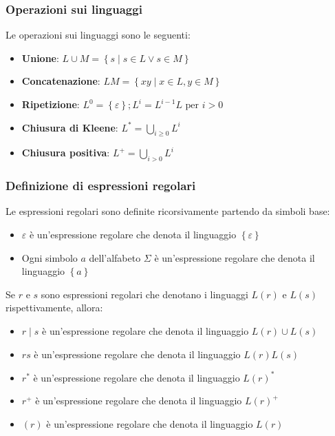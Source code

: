 \documentclass[a4paper]{article}
\begin{document}
\subsubsection{Operazioni sui linguaggi}
Le operazioni sui linguaggi sono le seguenti:
\begin{itemize}
  \item \textbf{Unione}:
    \( L \cup M = \left\{ s \mid s \in L \lor s \in M \right\} \)

  \item \textbf{Concatenazione}:
    \( LM = \left\{ xy \mid x \in L, y \in M \right\} \)

  \item \textbf{Ripetizione}:
    \( L^0 = \left\{ \varepsilon  \right\}; L^i = L^{i-1} L \text{ per } i > 0 \)

  \item \textbf{Chiusura di Kleene}:
    \( L^* = \bigcup_{i \geq 0} L^i \)

  \item \textbf{Chiusura positiva}:
    \( L^+ = \bigcup_{i > 0} L^i \)
\end{itemize}

\subsubsection{Definizione di espressioni regolari}
Le espressioni regolari sono definite ricorsivamente partendo da simboli base:
\begin{itemize}
  \item \( \varepsilon  \) è un'espressione regolare che denota il linguaggio
    \( \left\{ \varepsilon  \right\} \)

  \item Ogni simbolo \( a \) dell'alfabeto \( \Sigma  \) è un'espressione regolare
    che denota il linguaggio \( \left\{ a \right\} \)
\end{itemize}
Se \( r \) e \( s \) sono espressioni regolari che denotano i linguaggi \( L(r) \) e
\( L(s) \) rispettivamente, allora:
\begin{itemize}
  \item \( r \mid  s \) è un'espressione regolare che denota il linguaggio \( L(r) \cup L(s) \)
  \item \( rs \) è un'espressione regolare che denota il linguaggio \( L(r) L(s) \)
  \item \( r^* \) è un'espressione regolare che denota il linguaggio \( L(r)^* \)
  \item \( r^+ \) è un'espressione regolare che denota il linguaggio \( L(r)^+ \)
  \item \( (r) \) è un'espressione regolare che denota il linguaggio \( L(r) \)
\end{itemize}
\end{document}
